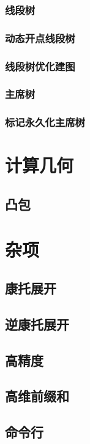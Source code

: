 \subsubsection{线段树}


\subsubsection{动态开点线段树}

\subsubsection{线段树优化建图}


\subsubsection{主席树}


\subsubsection{标记永久化主席树}


\section{计算几何}
\subsection{凸包}


\section{杂项}
\subsection{康托展开}


\subsection{逆康托展开}


\subsection{高精度}


\subsection{高维前缀和}


\subsection{命令行}


